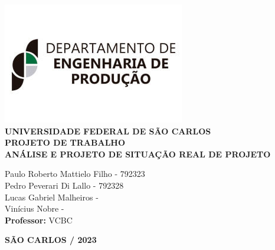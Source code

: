 \justifying %
\onehalfspacing %
\setlength{\parindent}{0cm}  %
\renewcommand*\familydefault{\rmdefault}
\thispagestyle{empty}
\begin{center}
\includegraphics[scale=0.6]{capa/logo-dep.jpg}\\
\vspace*{.8cm}
{\huge \textbf{UNIVERSIDADE FEDERAL DE SÃO CARLOS}}\\
\vspace*{.8cm}
{\Large \textbf{PROJETO DE TRABALHO}}\\
\vspace*{3cm}
{\Large \textbf{ANÁLISE E PROJETO DE SITUAÇÃO REAL DE PROJETO}}\\
\vspace*{4.5cm}
\begin{flushright}
    \onehalfspacing
    {\Large  Paulo Roberto Mattielo Filho - 792323}\\
    {\Large  Pedro Peverari Di Lallo - 792328}\\
    {\Large  Lucas Gabriel Malheiros - }\\
    {\Large  Vinícius Nobre - }\\
    \vspace*{.3cm}
    {\Large \textbf{Professor:}}
    {\Large VCBC}\\
\end{flushright}
\vspace*{\fill}
{\large \bf SÃO CARLOS / 2023}
\end{center}

